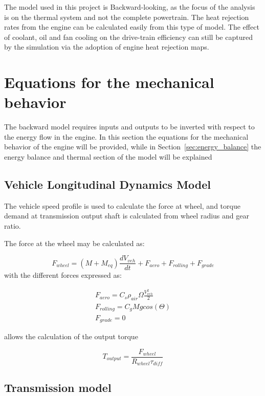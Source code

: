 The model used in this project is Backward-looking, as the focus of the analysis is on the thermal system and not the complete powertrain. The heat rejection rates from the engine can be calculated easily from this type of model. The effect of coolant, oil and fan cooling on the drive-train efficiency can still be captured by the simulation via the adoption of engine heat rejection maps.

\section{Equations for the mechanical behavior}

The backward model requires inputs and outputs to be inverted with respect to the energy flow in the engine. In this section the equations for the mechanical behavior of the engine will be provided, while in Section~\ref{sec:energy_balance} the energy balance and thermal section of the model will be explained

\subsection{Vehicle Longitudinal Dynamics Model}

The vehicle speed profile is used to calculate the force at wheel, and torque demand at transmission output shaft is calculated from wheel radius and gear ratio.

The force at the wheel may be calculated as:

\begin{equation}
  F_{wheel}=(M+M_{eq})\frac{dV_{veh}}{dt}+F_{aero}+F_{rolling}+F_{grade}
\end{equation}
with the different forces expressed as:

\begin{gather*}
    F_{aero} = C_{s}\rho_{air}\Omega \frac{V^{2}_{veh}}{2} \\
    F_{rolling} = C_{g}M g cos(\Theta) \\
    F_{grade} = 0
\end{gather*}


allows the calculation of the output torque

\begin{equation}
  T_{output}=\frac{F_{wheel}}{R_{wheel}\tau_{diff}}
\end{equation}

\subsection{Transmission model}

